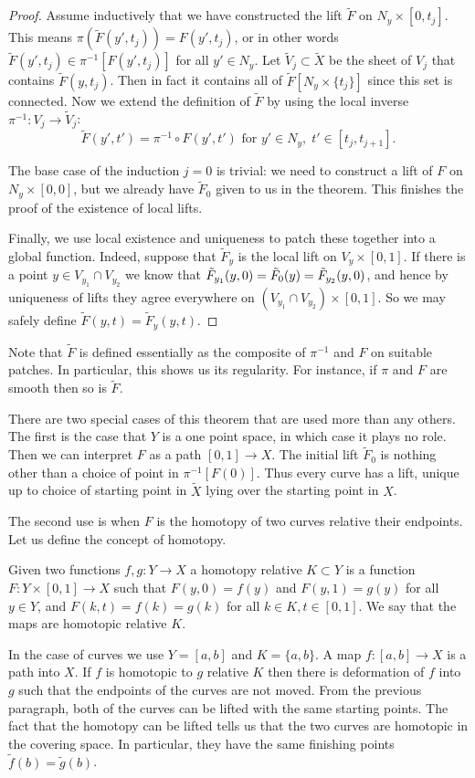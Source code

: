\begin{proof}
Assume inductively that we have constructed the lift $\tilde{F}$ on $N_y \times [0,t_j]$.
This means $\pi(\tilde{F}(y',t_j)) = F(y',t_j)$, or in other words $\tilde{F}(y',t_j) \in \pi^{-1}[F(y',t_j)]$ for all $y' \in N_{y}$.
Let $\tilde{V}_j \subset \tilde{X}$ be the sheet of $V_j$ that contains $\tilde{F}(y,t_j)$.
Then in fact it contains all of $\tilde{F}[N_{y}\times\{t_j\}]$ since this set is connected.
Now we extend the definition of $\tilde{F}$ by using the local inverse $\pi^{-1} : V_j \to \tilde{V}_j$:
\[
\tilde{F}(y', t') = \pi^{-1} \circ F(y',t') \text{ for } y' \in N_y,\; t' \in [t_j,t_{j+1}].
\]

The base case of the induction $j=0$ is trivial: we need to construct a lift of $F$ on $N_y\times[0,0]$, but we already have $\tilde{F}_0$ given to us in the theorem.
This finishes the proof of the existence of local lifts.

Finally, we use local existence and uniqueness to patch these together into a global function.
Indeed, suppose that $\tilde{F}_y$ is the local lift on $V_{y}\times[0,1]$.
If there is a point $y \in V_{y_1}\cap V_{y_2}$ we know that $\Tilde{F}_{y_1}(y,0) = \Tilde{F}_0(y) = \Tilde{F}_{y_2}(y,0)$, and hence by uniqueness of lifts they agree everywhere on $(V_{y_1}\cap V_{y_2})\times[0,1]$.
So we may safely define $\tilde{F}(y,t) = \tilde{F}_y(y,t)$.
\end{proof}

Note that $\tilde{F}$ is defined essentially as the composite of $\pi^{-1}$ and $F$ on suitable patches.
In particular, this shows us its regularity.
For instance, if $\pi$ and $F$ are smooth then so is $\tilde{F}$.

There are two special cases of this theorem that are used more than any others.
The first is the case that $Y$ is a one point space, in which case it plays no role.
Then we can interpret $F$ as a path $[0,1] \to X$.
The initial lift $\tilde{F}_0$ is nothing other than a choice of point in $\pi^{-1}[F(0)]$.
Thus every curve has a lift, unique up to choice of starting point in $\tilde{X}$ lying over the starting point in $X$.

The second use is when $F$ is the homotopy of two curves relative their endpoints.
Let us define the concept of homotopy.
\begin{definition}
\label{def:homotopy}
Given two functions $f,g : Y \to X$ a homotopy relative $K \subset Y$ is a function $F : Y \times [0,1] \to X$ such that $F(y,0) = f(y)$ and $F(y,1) = g(y)$ for all $y \in Y$, and $F(k,t) = f(k) = g(k)$ for all $k\in K, t\in[0,1]$.
We say that the maps are homotopic relative $K$.
\end{definition}
In the case of curves we use $Y = [a,b]$ and $K = \{a,b\}$.
A map $f : [a,b] \to X$ is a path into $X$.
If $f$ is homotopic to $g$ relative $K$ then there is deformation of $f$ into $g$ such that the endpoints of the curves are not moved.
From the previous paragraph, both of the curves can be lifted with the same starting points.
The fact that the homotopy can be lifted tells us that the two curves are homotopic in the covering space.
In particular, they have the same finishing points $\tilde{f}(b) = \tilde{g}(b)$. 

